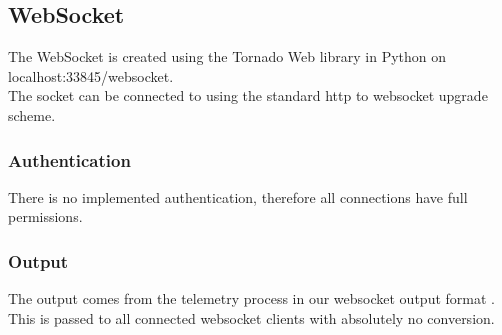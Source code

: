 \subsectionfont{\fontsize{14}{14}\selectfont}

\subsection{WebSocket}

The WebSocket is created using the Tornado Web library in Python on localhost:33845/websocket.\\
The socket can be connected to using the standard http to websocket upgrade scheme.

\subsubsection{Authentication}
There is no implemented authentication, therefore all connections have full permissions.\\

\subsubsection{Output}
The output comes from the telemetry process in our websocket output format \cite{websocket_format}. This is passed to all connected websocket clients with absolutely no conversion.